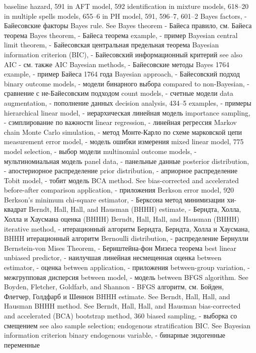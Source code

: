 baseline hazard, 591
in AFT model, 592
identification in mixture models, 618–20 in multiple spells models, 655–6
in PH model, 591, 596–7, 601–2
Bayes factors, - Байесовские факторы
Bayes rule. See Bayes theorem - Байеса правило, см. Байеса теорема
Bayes theorem, - Байеса теорема 
example, - пример
Bayesian central limit theorem, - Байесовская центральная предельная теорема
Bayesian information criterion (BIC), - Байесовский информационный критерий
see also AIC - см. также AIC
Bayesian methods, - Байесовские методы
Bayes 1764 example, - пример Байеса 1764 года
Bayesian approach, - Байесовский подход
binary outcome models, - модели бинарного выбора
compared to non-Bayesian, - сравнение с не-Байесовским подходом
count models, - счетные модели
data augmentation, - пополнение данных
decision analysis, 434–5
examples, - примеры
hierarchical linear model, - иерархическая линейная модель
importance sampling, - сэмплирование по важности
linear regression, - линейная регрессия
Markov chain Monte Carlo simulation, - метод Монте-Карло по схеме марковской цепи
measurement error model, - модель ошибки измерения
mixed linear model, 775
model selection, - выбор модели
multinomial outcome models, - мультиномиальная модель
panel data, - панельные данные
posterior distribution, - апостериорное распределение
prior distribution, - априорное распределение
Tobit model, - тобит модель
BCA method. See bias-corrected and accelerated before-after comparison
application, - приложения
Berkson error model, 920
Berkson’s minimum chi-square estimator, - Берксона метод минимизации хи-квадрат
Berndt, Hall, Hall, and Hausman (BHHH) estimate, - Берндта, Холла, Холла и Хаусмана оценка (BHHH)
Berndt, Hall, Hall, and Hausman (BHHH) iterative method, - итерационный алгоритм Берндта, Берндта, Холла и Хаусмана, BHHH итерационный алгоритм
Bernoulli distribution, - распределение Бернулли 
Bernstein-von Mises Theorem, - Бернштейна-фон Мизеса теорема
best linear unbiased predictor, - наилучшая линейная несмещенная оценка
between estimator, - оценка between
application, - приложения
between-group variation, - межгрупповая дисперсия
between model, - модель between
BFGS algorithm. See Boyden, Fletcher, Goldfarb, and Shannon - BFGS алгоритм, см. Бойден, Флетчер, Голдфарб и Шеннон 
BHHH estimate. See Berndt, Hall, Hall, and Hausman BHHH method. See Berndt, Hall, Hall, and Hausman 
bias-corrected and accelerated (BCA) bootstrap
method, 360
biased sampling, - выборка со смещением
see also sample selection; endogenous stratification BIC. See Bayesian information criterion
binary endogenous variable, - бинарные эндогенные переменные
